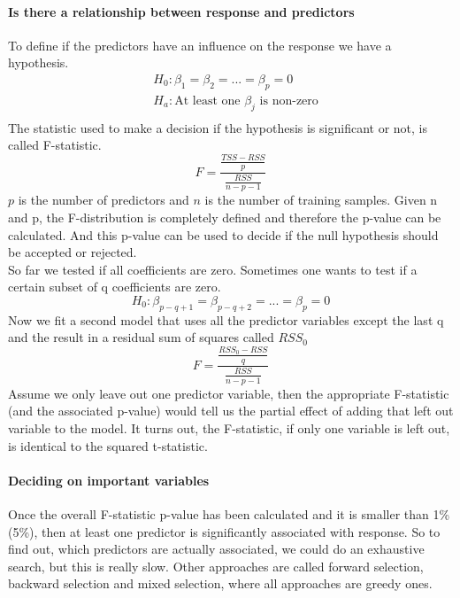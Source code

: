 \documentclass[../document.tex]{subfiles}
\begin{document}
	\paragraph{Is there a relationship between response and predictors}
	To define if the predictors have an influence on the response we have a hypothesis.
	\begin{equation}
	\begin{split}
		&H_{0}:\beta_{1}=\beta_{2}=...=\beta_{p}=0\\
		&H_{a}:\text{At least one }\beta_{j}\text{ is non-zero}\\
	\end{split}
	\end{equation}
	The statistic used to make a decision if the hypothesis is significant or not, is called F-statistic.
	\begin{equation}
		F = \frac{\frac{TSS-RSS}{p}}{\frac{RSS}{n-p-1}}
	\end{equation}
	\(p\) is the number of predictors and \(n\) is the number of training samples.
	Given n and p, the F-distribution is completely defined and therefore the p-value can be calculated. And this p-value can be used to decide if the null hypothesis should be accepted or rejected.\\
	So far we tested if all coefficients are zero. Sometimes one wants to test if a certain subset of q coefficients are zero.
	\begin{equation}
		H_{0}: \beta_{p-q+1}=\beta_{p-q+2}=...=\beta_{p}=0
	\end{equation}
	Now we fit a second model that uses all the predictor variables except the last q and the result in a residual sum of squares called \(RSS_{0}\)
	\begin{equation}
		F = \frac{\frac{RSS_{0}-RSS}{q}}{\frac{RSS}{n-p-1}}
	\end{equation}
	Assume we only leave out one predictor variable, then the appropriate F-statistic (and the associated p-value) would tell us the partial effect of adding that left out variable to the model. It turns out, the F-statistic, if only one variable is left out, is identical to the squared t-statistic.

	\paragraph{Deciding on important variables}
	Once the overall F-statistic p-value has been calculated and it is smaller than 1\% (5\%), then at least one predictor is significantly associated with response. So to find out, which predictors are actually associated, we could do an exhaustive search, but this is really slow. Other approaches are called forward selection, backward selection and mixed selection, where all approaches are greedy ones.
\end{document}
